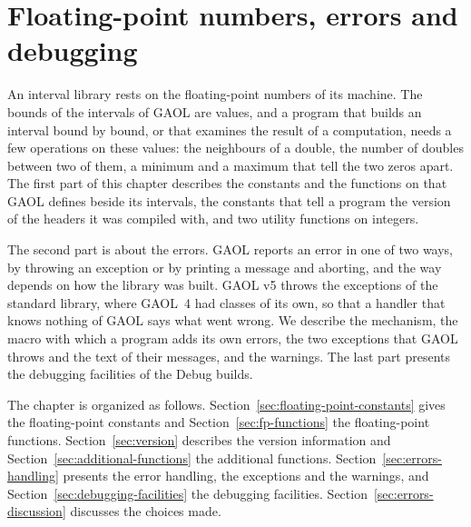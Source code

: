\chapter{Floating-point numbers, errors and debugging}%
\label{chap:errors}\label{chap:numbers}

An interval library rests on the floating-point numbers of its machine. The
bounds of the intervals of GAOL are  values, and a program that
builds an interval bound by bound, or that examines the result of a
computation, needs a few operations on these values: the neighbours of a
double, the number of doubles between two of them, a minimum and a maximum
that tell the two zeros apart. The first part of this chapter describes the
constants and the functions on  that GAOL defines beside its
intervals, the constants that tell a program the version of the headers it
was compiled with, and two utility functions on integers.

\medskip
The second part is about the errors. GAOL reports an error in one of two
ways, by throwing an exception or by printing a message and aborting, and the
way depends on how the library was built. GAOL v5 throws the exceptions of
the standard library, where GAOL~4 had classes of its own, so that a handler
that knows nothing of GAOL says what went wrong.\newinvfive{} We describe
the mechanism, the macro with which a program adds its own errors, the two
exceptions that GAOL throws and the text of their messages, and the warnings.
The last part presents the debugging facilities of the Debug builds.

\medskip
The chapter is organized as follows.
Section~\ref{sec:floating-point-constants} gives the floating-point constants
and Section~\ref{sec:fp-functions} the floating-point functions.
Section~\ref{sec:version} describes the version information and
Section~\ref{sec:additional-functions} the additional functions.
Section~\ref{sec:errors-handling} presents the error handling, the exceptions
and the warnings, and Section~\ref{sec:debugging-facilities} the debugging
facilities. Section~\ref{sec:errors-discussion} discusses the choices made.

